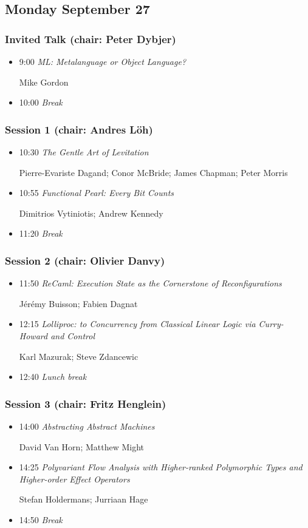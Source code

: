 \documentclass{article}[10pt]
\newenvironment{tightItemize}{
\begin{itemize}
  \setlength{\itemsep}{1pt}
  \setlength{\parskip}{0pt}
  \setlength{\parsep}{0pt}}{\end{itemize}
}
\newcommand{\programDate}[1]{\newpage\subsection*{#1}}
\newcommand{\session}[1]{\subsubsection*{#1}}
\begin{document}
          \programDate{Monday September 27}

          \session{Invited Talk (chair: Peter Dybjer)}

          \begin{tightItemize}
            \item[9:00] \textit{ML: Metalanguage or Object Language?}

            Mike Gordon 

            \item[10:00] \textit{Break}
          \end{tightItemize}

          \session{Session 1 (chair: Andres L\"oh)}

          \begin{tightItemize}
            \item[10:30] \textit{The Gentle Art of Levitation}

            Pierre-Evariste Dagand; Conor McBride; James Chapman; Peter Morris

            \item[10:55]\textit{Functional Pearl: Every Bit Counts}

            Dimitrios Vytiniotis; Andrew Kennedy 

            \item[11:20]\textit{Break}
          \end{tightItemize}

          \session{Session 2 (chair: Olivier Danvy)}

          \begin{tightItemize}
            \item[11:50]\textit{ReCaml: Execution State as the
            Cornerstone of Reconfigurations}

            J\'er\'emy Buisson; Fabien Dagnat

            \item[12:15]\textit{Lolliproc: to Concurrency from Classical
            Linear Logic via Curry-Howard and Control}

            Karl Mazurak; Steve Zdancewic 

            \item[12:40]\textit{Lunch break}
          \end{tightItemize}

          \session{Session 3 (chair: Fritz Henglein)}

          \begin{tightItemize}
            \item[14:00]\textit{Abstracting Abstract Machines}

            David Van Horn; Matthew Might 

            \item[14:25]\textit{Polyvariant Flow Analysis with
            Higher-ranked Polymorphic Types and Higher-order Effect
            Operators}

            Stefan Holdermans; Jurriaan Hage
            

            \item[14:50]\textit{Break}
          \end{tightItemize}
\end{document}
